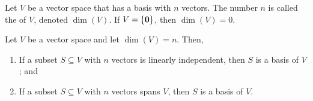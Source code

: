 \begin{definition}
Let $ V $ be a vector space that has a basis with $ n $ vectors. The number $ n $ is called the  of $ V $, denoted $ \dim(V) $. If $ V=\{\mathbf{0}\} $, then $ \dim(V)=0 $.
\end{definition}

\begin{theorem}
Let $ V $ be a vector space and let $ \dim(V)=n $. Then,
\begin{enumerate}
    \item If a subset $ S\subseteq V $ with $ n $ vectors is linearly independent, then $ S $ is a basis of $ V $; and
    \item If a subset $ S\subseteq V $ with $ n $ vectors spans $ V $, then $ S $ is a basis of $ V $.
\end{enumerate}
\end{theorem}